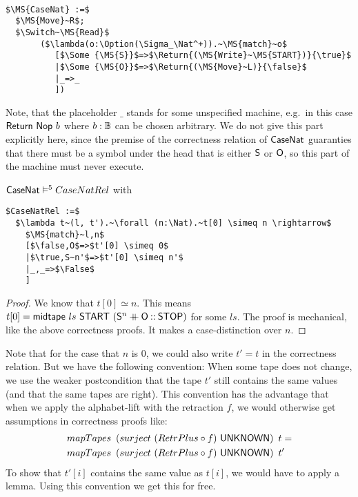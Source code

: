 \begin{definition}[$\MS{CaseNat}$][CaseNat]
  \label{def:CaseNat}
  ~
\begin{lstlisting}[style=semicoqstyle]
$\MS{CaseNat} :=$
  $\MS{Move}~R$; 
  $\Switch~\MS{Read}$ 
       ($\lambda(o:\Option(\Sigma_\Nat^+)).~\MS{match}~o$
          [$\Some {\MS{S}}$=>$\Return{(\MS{Write}~\MS{START})}{\true}$
          |$\Some {\MS{O}}$=>$\Return{(\MS{Move}~L)}{\false}$
          |_=>_ 
          ])
\end{lstlisting}
\end{definition}

Note, that the placeholder $\_$ stands for some unspecified machine, e.g.\ in this case $\mathsf{Return}~\mathsf{Nop}~b$ where $b:\mathbb{B}$ can be chosen arbitrary.
We do not give this part explicitly here, since the premise of the correctness relation of $\MS{CaseNat}$ guaranties that there must be a symbol
under the head that is either $\mathsf{S}$ or $\mathsf{O}$, so this part of the machine must never execute.

\begin{lemma}
  $\mathsf{CaseNat} \mathrel{\vDash^{5}} CaseNatRel$ with
\begin{lstlisting}[style=semicoqstyle]
$CaseNatRel :=$
  $\lambda t~(l, t').~\forall (n:\Nat).~t[0] \simeq n \rightarrow$
    $\MS{match}~l,n$
    [$\false,O$=>$t'[0] \simeq 0$
    |$\true,S~n'$=>$t'[0] \simeq n'$
    |_,_=>$\False$
    ]
\end{lstlisting}
\end{lemma}
\begin{proof}
  We know that $t[0] \simeq n$.  This means $t[0] = \mathsf{midtape}~ls~\mathsf{START}~(\mathsf{S}^n \mathbin{+\mkern-10mu+} \mathsf{O} \mathbin{::} \mathsf{STOP})$ for some $ls$.  The proof is
  mechanical, like the above correctness proofs.  It makes a case-distinction over $n$.
\end{proof}

Note that for the case that $n$ is $0$, we could also write $t'=t$ in the correctness relation.  But we have the following convention: When some tape
does not change, we use the weaker postcondition that the tape $t'$ still contains the same values (and that the same tapes are right).  This
convention has the advantage that when we apply the alphabet-lift with the retraction $f$, we would otherwise get assumptions in correctness proofs
like:
\begin{align*}
  & mapTapes~\left(surject~(RetrPlus \circ f)~\mathsf{UNKNOWN}\right)~t = \\
  & mapTapes~\left(surject~(RetrPlus \circ f)~\mathsf{UNKNOWN}\right)~t'
\end{align*}
To show that $t'[i]$ contains the same value as $t[i]$, we would have to apply a lemma.  Using this convention we get this for free.


